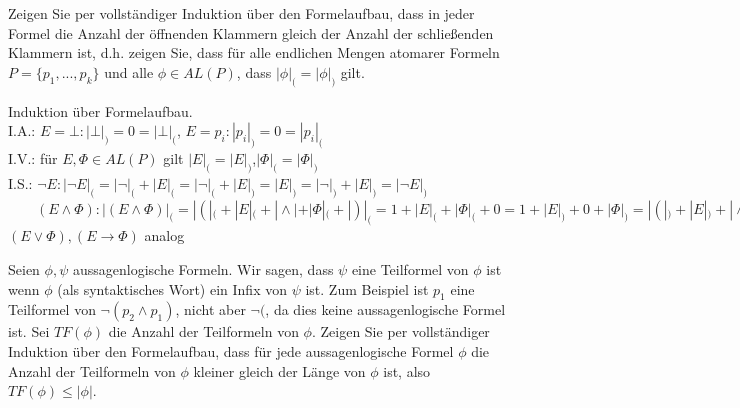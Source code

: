 \documentclass[10pt, a4paper]{exam}
\begin{document}
\begin{questions}

    \question Zeigen Sie per vollständiger Induktion über den Formelaufbau, dass in jeder Formel die Anzahl der öffnenden Klammern gleich der Anzahl der schließenden Klammern ist, d.h. zeigen Sie, dass für alle endlichen Mengen atomarer Formeln $P=\{p_1,...,p_k\}$ und alle $\phi\in AL(P)$, dass $|\phi|_(=|\phi|_)$ gilt.

    \begin{solution}

        Induktion über Formelaufbau.                                                                             \\
        I.A.: $E=\bot: |\bot|_) = 0 = |\bot|_($, $E=p_i: |p_i|_) = 0 = |p_i|_($                                  \\
        I.V.: für $E,\Phi \in AL(P)$ gilt $|E|_( = |E|_)$,$|\Phi|_(=|\Phi|_)$                                    \\
        I.S.: $\lnot E: |\lnot E|_( = |\lnot |_( +|E|_( = |\lnot|_(+|E|_) = |E|_)= |\lnot|_)+|E|_)= |\lnot E|_)$ \\
        $\quad\quad (E\wedge \Phi): |(E\wedge\Phi)|_(= |(|_( + |E|_( + |\wedge| + |\Phi|_( + |)|_( = 1 + |E|_( + |\Phi|_( +0 = 1+|E|_)+0+|\Phi|_) = |(|_) + |E|_) + |\wedge| + |\Phi|_) + |)|_) = |(E\wedge\Phi)_)$
        \\$(E\vee\Phi), (E\rightarrow\Phi)$ analog
    \end{solution}

    \question Seien $\phi, \psi$ aussagenlogische Formeln. Wir sagen, dass $\psi$ eine Teilformel von $\phi$ ist wenn $\phi$ (als syntaktisches Wort) ein Infix von $\psi$ ist. Zum Beispiel ist $p_1$ eine Teilformel von $\lnot (p_2\wedge p_1)$, nicht aber $\lnot($, da dies keine aussagenlogische Formel ist. Sei $TF(\phi)$ die Anzahl der Teilformeln von $\phi$. Zeigen Sie per vollständiger Induktion über den Formelaufbau, dass für jede aussagenlogische Formel $\phi$ die Anzahl der Teilformeln von $\phi$ kleiner gleich der Länge von $\phi$ ist, also $TF(\phi) \leq |\phi|$.


\end{questions}
\end{document}
